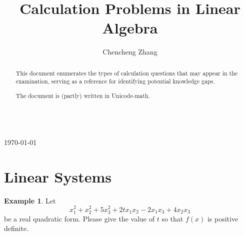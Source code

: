 \documentclass[12pt, reqno]{amsart}
\theoremstyle{plain}
\theoremstyle{definition}
\newtheorem{example}[theorem]{Example}
\theoremstyle{remark}
\numberwithin{equation}{section}
\begin{document}
\setcounter{page}{1}


\hfill  {\small }\\
{\small \today}\hfill  {\small }

\centerline{}

\centerline{}

\title{Calculation Problems in Linear Algebra}

\author{Chencheng Zhang}


\address{School of mathematics, Shanghai Jiao Tong University, Shanghai, PRC.}
\email{\textcolor[rgb]{0.00,0.00,0.84}{zhangchencheng@sjtu.edu.cn}}

\makeatletter
{}
\makeatother




\begin{abstract}
    This document enumerates the types of calculation questions that may appear in the examination, serving as a reference for identifying potential knowledge gaps.

    The document is (partly) written in Unicode-math.
\end{abstract} \maketitle








\section{Linear Systems}

\begin{example}\label{Quadratic forms}
    Let
    \begin{equation}
        x_1^2+x_2^2+5x_3^2+2tx_1x_2-2x_1x_3+4x_2x_3
    \end{equation}
    be a real quadratic form. Please give the value of $t$ so that $f(x)$ is positive definite.
\end{example}
\end{document}
